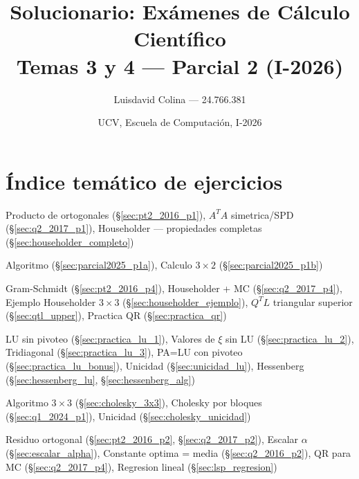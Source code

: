 \documentclass[11pt,a4paper]{article}
\title{\textbf{Solucionario: Exámenes de Cálculo Científico}\\
\large Temas 3 y 4 --- Parcial 2 (I-2026)}
\author{Luisdavid Colina --- 24.766.381}
\date{UCV, Escuela de Computación, I-2026}
\begin{document}
\maketitle

\label{pgindice}
\section*{\'Indice tem\'atico de ejercicios}

\begin{description}[style=multiline, leftmargin=5.5cm, font=\bfseries]
  \item[Matrices ortogonales]
    Producto de ortogonales (\S\ref{sec:pt2_2016_p1}),
    $A^TA$ simetrica/SPD (\S\ref{sec:q2_2017_p1}),
    Householder --- propiedades completas (\S\ref{sec:householder_completo})

  \item[SVD]
    Algoritmo (\S\ref{sec:parcial2025_p1a}),
    Calculo $3\times2$ (\S\ref{sec:parcial2025_p1b})

  \item[Factorizacion QR]
    Gram-Schmidt (\S\ref{sec:pt2_2016_p4}),
    Householder + MC (\S\ref{sec:q2_2017_p4}),
    Ejemplo Householder $3\times3$ (\S\ref{sec:householder_ejemplo}),
    $Q^TL$ triangular superior (\S\ref{sec:qtl_upper}),
    Practica QR (\S\ref{sec:practica_qr})

  \item[Factorizacion LU]
    LU sin pivoteo (\S\ref{sec:practica_lu_1}),
    Valores de $\xi$ sin LU (\S\ref{sec:practica_lu_2}),
    Tridiagonal (\S\ref{sec:practica_lu_3}),
    PA=LU con pivoteo (\S\ref{sec:practica_lu_bonus}),
    Unicidad (\S\ref{sec:unicidad_lu}),
    Hessenberg (\S\ref{sec:hessenberg_lu}, \S\ref{sec:hessenberg_alg})

  \item[Factorizacion Cholesky]
    Algoritmo $3\times3$ (\S\ref{sec:cholesky_3x3}),
    Cholesky por bloques (\S\ref{sec:q1_2024_p1}),
    Unicidad (\S\ref{sec:cholesky_unicidad})

  \item[Minimos cuadrados]
    Residuo ortogonal (\S\ref{sec:pt2_2016_p2}, \S\ref{sec:q2_2017_p2}),
    Escalar $\alpha$ (\S\ref{sec:escalar_alpha}),
    Constante optima = media (\S\ref{sec:q2_2016_p2}),
    QR para MC (\S\ref{sec:q2_2017_p4}),
    Regresion lineal (\S\ref{sec:lsp_regresion})


\end{description}
\end{document}
